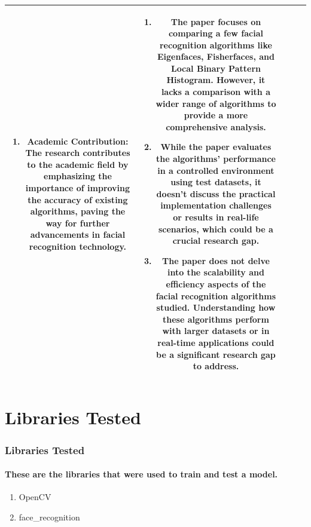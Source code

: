\documentclass[aspectratio=169]{beamer}
\begin{document}
\begin{frame}
\begin{table}[]
\begin{tabular}{|c|c|c|c|c|}
\begin{minipage}[t]{0.3\textwidth}
\begin{enumerate}
					\item Academic Contribution: The research contributes to the academic field by emphasizing the importance of improving the accuracy of existing algorithms, paving the way for further advancements in facial recognition technology.
				\end{enumerate}
			\end{minipage} &
			\begin{minipage}[t]{0.3\textwidth}
				\begin{enumerate}
					\item The paper focuses on comparing a few facial recognition algorithms like Eigenfaces, Fisherfaces, and Local Binary Pattern Histogram. However, it lacks a comparison with a wider range of algorithms to provide a more comprehensive analysis.

					\item While the paper evaluates the algorithms' performance in a controlled environment using test datasets, it doesn't discuss the practical implementation challenges or results in real-life scenarios, which could be a crucial research gap.

					\item The paper does not delve into the scalability and efficiency aspects of the facial recognition algorithms studied. Understanding how these algorithms perform with larger datasets or in real-time applications could be a significant research gap to address.
				\end{enumerate}
			\end{minipage}                                                                                                                                                                                                                                                                             \\ \hline
		\end{tabular}
	\end{table}
\end{frame}

\section{Libraries Tested}
\begin{frame}
	\centering
	\frametitle{Libraries Tested}
	\framesubtitle{These are the libraries that were used to train and test a model.}
	\begin{enumerate}
		\item OpenCV
		\item face\_recognition
	\end{enumerate}
	\begin{minipage}{0.95\textwidth}
	\end{minipage}
\end{frame}
\end{document}
